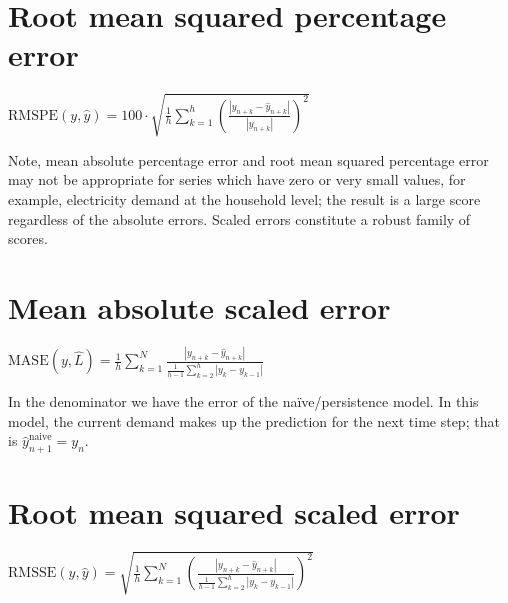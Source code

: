 \section{Root mean squared percentage error}\label{rmspe}
\begin{definition}
    $\mathrm{RMSPE}(y,\hat{y})=100\cdot\sqrt{\frac{1}{h}\sum\limits_{k=1}^{h} \left(\frac{|y_{n+k}-\hat{y}_{n+k}|}{|y_{n+k}|}\right)^2}$
\end{definition}
Note, mean absolute percentage error and root mean squared percentage error may not be appropriate for series which have zero or very small values, for example, electricity demand at the household level; the result is a large score regardless of the absolute errors.
Scaled errors constitute a robust family of scores.
\section{Mean absolute scaled error}\label{mase}
\begin{definition}
    $\mathrm{MASE}(y,\hat{L})=\frac{1}{h}\sum\limits_{k=1}^N\frac{|y_{n+k}-\hat{y}_{n+k}|}{\frac{1}{h-1}\sum\limits_{k=2}^{h}|y_{k}-y_{k-1}|}$
\end{definition}
In the denominator we have the error of the naïve/persistence model. 
In this model, the current demand makes up the prediction for the next time step; that is $\hat{y}^{\mathrm{naive}}_{n+1}=y_{n}$.
\section{Root mean squared scaled error}\label{rmsse}
\begin{definition}
    $\mathrm{RMSSE}(y,\hat{y})=\sqrt{\frac{1}{h}\sum\limits_{k=1}^N\left(\frac{|y_{n+k}-\hat{y}_{n+k}|}{\frac{1}{h-1}\sum\limits_{k=2}^{h}|y_{k}-y_{k-1}|}\right)^2}$
\end{definition}


